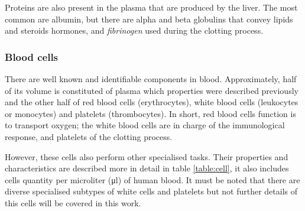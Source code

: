 Proteins are also present in the plasma that are produced by the liver. The most common are albumin, but there are alpha and beta globulins that convey lipids and steroids hormones, and \textit{fibrinogen} used during the clotting process.

\subsubsection{Blood cells}
\label{section literature 1.2}
There are well known and identifiable components in blood. Approximately, half of its volume is constituted of plasma which properties were described previously and the other half of red blood cells (erythrocytes), white blood cells (leukocytes or monocytes) and platelets (thrombocytes). In short, red blood cells function is to transport oxygen; the white blood cells are in charge of the immunological response, and platelets of the clotting process.

However, these cells also perform other specialised tasks. Their properties and characteristics are described more in detail in table \ref{table:cell}, it also includes cells quantity per microliter (\si{\micro\litre}) of human blood. It must be noted that there are diverse specialised subtypes of white cells and platelets but not further details of this cells will be covered in this work.

